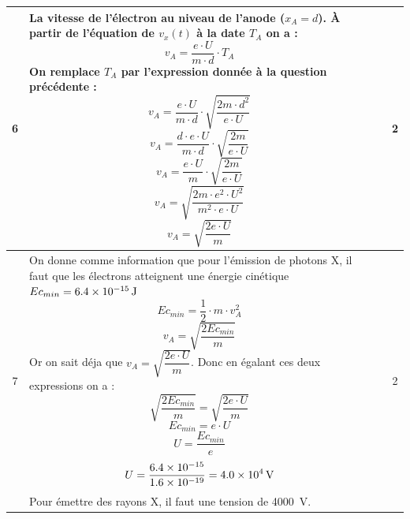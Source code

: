 \documentclass[a4paper,11pt,fleqn]{article}%
\begin{document}
\begin{longtable}{|c|m{.7\linewidth}|c|c|}
    6 & La vitesse de l'électron au niveau de l'anode ($x_A = d$). À partir de l'équation de $v_x(t)$ à la date $T_A$ on a :
    $$ v_A = \dfrac{e\cdot U}{m\cdot d}\cdot T_A$$
    On remplace $T_A$ par l'expression donnée à la question précédente :
    $$ v_A = \dfrac{e\cdot U}{m\cdot d}\cdot \sqrt{\dfrac{ 2 m\cdot d^2}{e\cdot U}}$$
    $$ v_A = \dfrac{d\cdot e\cdot U}{m\cdot d}\cdot \sqrt{\dfrac{ 2 m}{e\cdot U}}$$
    $$ v_A = \dfrac{e\cdot U}{m}\cdot \sqrt{\dfrac{ 2 m}{e\cdot U}}$$
    $$ v_A = \sqrt{\dfrac{ 2 m\cdot e ^2\cdot U^2}{m^2\cdot e\cdot U}}$$
    $$ v_A = \sqrt{\dfrac{ 2 e\cdot U}{m}}$$
     & & 2\\
    \hline

    7 & On donne comme information que pour l'émission de photons X, il faut que les électrons atteignent une énergie cinétique $Ec_{min} = \SI{6,4E-15}{\joule}$
    $$ Ec_{min} =\dfrac{1}{2}\cdot m\cdot v_A^2$$
    $$ v_A = \sqrt{\dfrac{2 Ec_{min}}{m}}$$
    Or on sait déja que $ v_A = \sqrt{\dfrac{ 2 e\cdot U}{m}}$. Donc en égalant ces deux expressions on a :
    $$\sqrt{\dfrac{2 Ec_{min}}{m}} = \sqrt{\dfrac{ 2 e\cdot U}{m}}$$
    $$Ec_{min} =  e\cdot U$$
    $$U = \dfrac{Ec_{min}}{e}$$
    $$U = \dfrac{\num{6,4E-15}}{\num{1,6E-19}} = \SI{4,0E4}{V}$$
    Pour émettre des rayons X, il faut une tension de \SI{4000}{V}.
    & & 2\\
    \hline
\end{longtable}
\end{document}
